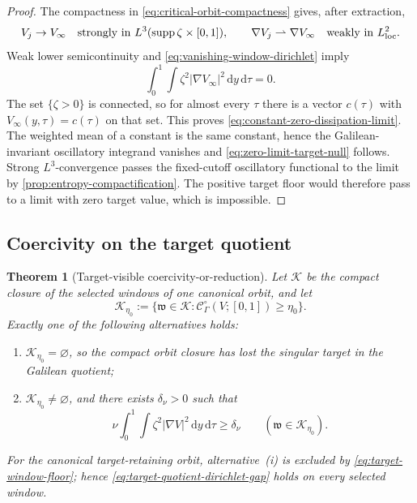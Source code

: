 \documentclass[11pt]{amsart}
\numberwithin{equation}{section}
\theoremstyle{plain}
\newtheorem{theorem}{Theorem}[section]
\theoremstyle{definition}
\theoremstyle{remark}
\newcommand{\dd}{\,\mathrm d}
\newcommand{\supp}{\operatorname{supp}}
\newcommand{\OscMass}{\mathcal C^{\circ}}
\begin{document}
\begin{proof}
The compactness in \eqref{eq:critical-orbit-compactness} gives, after
extraction,
\[
 V_j\to V_\infty
 \quad\hbox{strongly in }L^3(\supp\zeta\times[0,1]),
 \qquad
 \nabla V_j\rightharpoonup\nabla V_\infty
 \quad\hbox{weakly in }L^2_{\mathrm{loc}}.
\]
Weak lower semicontinuity and
\eqref{eq:vanishing-window-dirichlet} imply
\[
 \int_0^1\int\zeta^2|\nabla V_\infty|^2\dd y\dd\tau=0.
\]
The set \(\{\zeta>0\}\) is connected, so for almost every \(\tau\) there is
a vector \(c(\tau)\) with
\(V_\infty(y,\tau)=c(\tau)\) on that set.  This proves
\eqref{eq:constant-zero-dissipation-limit}.  The weighted mean of a constant
is the same constant, hence the Galilean-invariant oscillatory integrand
vanishes and \eqref{eq:zero-limit-target-null} follows.  Strong
\(L^3\)-convergence passes the fixed-cutoff oscillatory functional to the
limit by \cref{prop:entropy-compactification}.  The positive target floor
would therefore pass to a limit with zero target value, which is impossible.
\end{proof}

\subsection{Coercivity on the target quotient}
\label{app:target-quotient-coercivity}

\begin{theorem}[Target-visible coercivity-or-reduction]
\label{thm:target-visible-coercivity-reduction}
Let \(\mathcal K\) be the compact closure of the selected windows of one
canonical orbit, and let
\[
 \mathcal K_{\eta_0}
 :=\{\mathfrak w\in\mathcal K:
       \OscMass_\Gamma(V;[0,1])\ge\eta_0\}.
\]
Exactly one of the following alternatives holds:
\begin{enumerate}[label=\textup{(\roman*)},leftmargin=2.2em]
\item \(\mathcal K_{\eta_0}=\varnothing\), so the compact orbit closure has
lost the singular target in the Galilean quotient;
\item \(\mathcal K_{\eta_0}\ne\varnothing\), and there exists
\(\delta_\nu>0\) such that
\begin{equation}\label{eq:target-quotient-dirichlet-gap}
 \nu\int_0^1\int\zeta^2|\nabla V|^2\dd y\dd\tau
 \ge\delta_\nu
 \qquad(\mathfrak w\in\mathcal K_{\eta_0}).
\end{equation}
\end{enumerate}
For the canonical target-retaining orbit, alternative~\textup{(i)} is
excluded by \eqref{eq:target-window-floor}; hence
\eqref{eq:target-quotient-dirichlet-gap} holds on every selected window.
\end{theorem}
\end{document}
